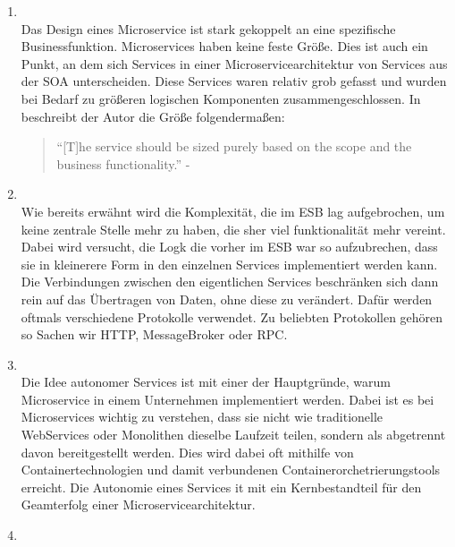 \begin{definition}
	\hfill
	\begin{enumerate}
		\item {}\\
		Das Design eines Microservice ist stark gekoppelt an eine spezifische Businessfunktion.\autocite[S. 8]{microservice_enterprise} Microservices haben keine feste Größe. Dies ist auch ein Punkt, an dem sich Services in einer Microservicearchitektur von Services aus der \ac{SOA} unterscheiden. Diese Services waren relativ grob gefasst und wurden bei Bedarf zu größeren logischen Komponenten zusammengeschlossen. In  beschreibt der Autor die Größe folgendermaßen:
		\begin{quote}
			\enquote{[T]he service should be sized purely based on the scope and the business functionality.} - \citeauthor{microservice_enterprise}
		\end{quote}
		\item {}\\
		Wie bereits erwähnt wird die Komplexität, die im ESB lag aufgebrochen, um keine zentrale Stelle mehr zu haben, die sher viel funktionalität mehr vereint. Dabei wird versucht, die Logk die vorher im ESB war so aufzubrechen, dass sie in kleinerere Form in den einzelnen Services implementiert werden kann. Die Verbindungen zwischen den eigentlichen Services beschränken sich dann rein auf das Übertragen von Daten, ohne diese zu verändert. Dafür werden oftmals verschiedene Protokolle verwendet. Zu beliebten Protokollen gehören so Sachen wir HTTP, MessageBroker oder \ac{RPC}.
		\item {}\\
		Die Idee autonomer Services ist mit einer der Hauptgründe, warum Microservice in einem Unternehmen implementiert werden. Dabei ist es bei Microservices wichtig zu verstehen, dass sie nicht wie traditionelle WebServices oder Monolithen dieselbe Laufzeit teilen, sondern als abgetrennt davon bereitgestellt werden. Dies wird dabei oft mithilfe von Containertechnologien und damit verbundenen Containerorchetrierungstools erreicht. Die Autonomie eines Services it mit ein Kernbestandteil für den Geamterfolg einer Microservicearchitektur.
		\item {}\\

\end{enumerate}
\end{definition}
